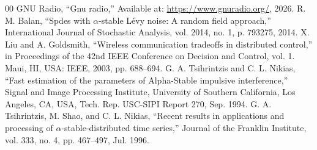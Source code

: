 \documentclass[conference]{IEEEtran}
\begin{document}
\begin{thebibliography}{00}
 {GNU Radio}, ``Gnu radio,'' Available at: \url{https://www.gnuradio.org/}, 2026.
 R. M. Balan, ``Spdes with {${\alpha}$}-stable {L{\'e}vy} noise: A random field approach,'' International Journal of Stochastic Analysis, vol. 2014, no. 1, p. 793275, 2014.
 X. Liu and A. Goldsmith, ``Wireless communication tradeoffs in distributed control,'' in Proceedings of the 42nd IEEE Conference on Decision and Control, vol. 1. Maui, HI, USA: IEEE, 2003, pp. 688--694.
 G. A. Tsihrintzis and C. L. Nikias, ``Fast estimation of the parameters of {Alpha-Stable} impulsive interference,'' Signal and Image Processing Institute, University of Southern California, Los Angeles, CA, USA, Tech. Rep. USC-SIPI Report 270, Sep. 1994.
 G. A. Tsihrintzis, M. Shao, and C. L. Nikias, ``Recent results in applications and processing of {${\alpha}$}-stable-distributed time series,'' Journal of the Franklin Institute, vol. 333, no. 4, pp. 467--497, Jul. 1996.
\end{thebibliography}
\end{document}
